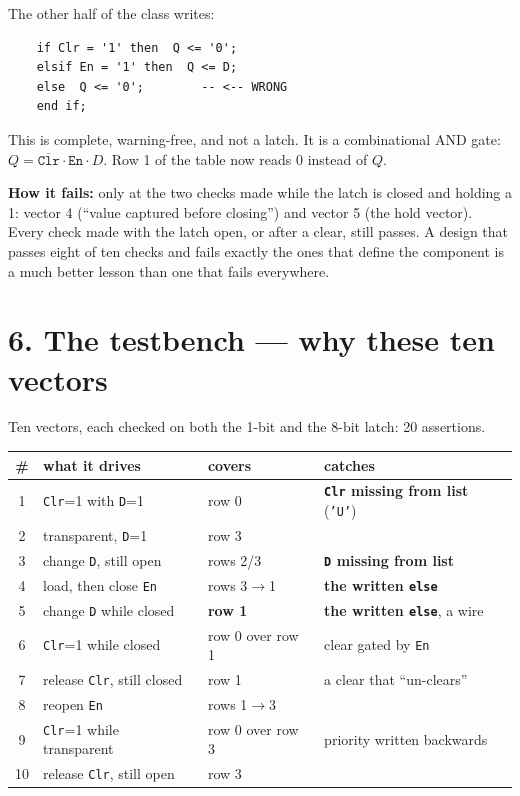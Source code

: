 \documentclass[11pt]{article}
\newcommand{\code}[1]{\texttt{#1}}
\begin{document}
The other half of the class writes:

\begin{lstlisting}
    if Clr = '1' then  Q <= '0';
    elsif En = '1' then  Q <= D;
    else  Q <= '0';        -- <-- WRONG
    end if;
\end{lstlisting}

This is complete, warning-free, and not a latch. It is a combinational AND gate:
$Q = \overline{\code{Clr}} \cdot \code{En} \cdot D$. Row 1 of the table now reads 0
instead of $Q$.

\textbf{How it fails:} only at the two checks made while the latch is closed and
holding a 1: vector 4 (``value captured before closing'') and vector 5 (the hold
vector). Every check made with the latch open, or after a clear, still passes. A
design that passes eight of ten checks and fails exactly the ones that define the
component is a much better lesson than one that fails everywhere.

\section*{6. The testbench --- why these ten vectors}

Ten vectors, each checked on both the 1-bit and the 8-bit latch: 20 assertions.

\begin{center}
\begin{tabular}{clll}
\toprule
\# & what it drives & covers & catches \\
\midrule
1 & \code{Clr}=1 with \code{D}=1 & row 0 & \textbf{\code{Clr} missing from list} (\code{'U'}) \\
2 & transparent, \code{D}=1 & row 3 & \\
3 & change \code{D}, still open & rows 2/3 & \textbf{\code{D} missing from list} \\
4 & load, then close \code{En} & rows 3$\to$1 & \textbf{the written \code{else}} \\
5 & change \code{D} while closed & \textbf{row 1} & \textbf{the written \code{else}}, a wire \\
6 & \code{Clr}=1 while closed & row 0 over row 1 & clear gated by \code{En} \\
7 & release \code{Clr}, still closed & row 1 & a clear that ``un-clears'' \\
8 & reopen \code{En} & rows 1$\to$3 & \\
9 & \code{Clr}=1 while transparent & row 0 over row 3 & priority written backwards \\
10 & release \code{Clr}, still open & row 3 & \\
\bottomrule
\end{tabular}
\end{center}
\end{document}
